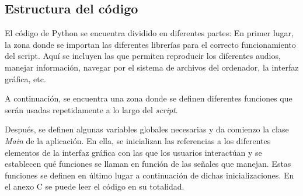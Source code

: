 \documentclass[11pt,a4paper,twoside]{book}
\begin{document}
            \subsection{Estructura del código}
                El código de Python se encuentra dividido en diferentes partes:
                En primer lugar, la zona donde se importan las diferentes librerías para el correcto funcionamiento del script. Aquí se incluyen las que permiten reproducir los diferentes audios, manejar información, navegar por el sistema de archivos del ordenador, la interfaz gráfica, etc.
                
                A continuación, se encuentra una zona donde se definen diferentes funciones que serán usadas repetidamente a lo largo del \textit{script}. 
                
                Después, se definen algunas variables globales necesarias y da comienzo la clase \textit{Main} de la aplicación. En ella, se inicializan las referencias a los diferentes elementos de la interfaz gráfica con las que los usuarios interactúan y se establecen qué funciones se llaman en función de las señales que manejan. Estas funciones se definen en último lugar a continuación de dichas inicializaciones. En el anexo C se puede leer el código en su totalidad.
               
        


\end{document}
